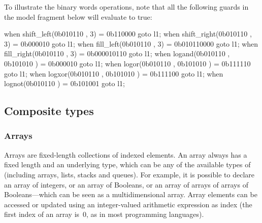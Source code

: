 \begin{example}
	To illustrate the binary words operations, note that all the following guards in the model fragment below will evaluate to true:

\begin{IMITATORmodel}
when shift_left(0b010110 , 3)     = 0b110000    goto l1;
when shift_right(0b010110 , 3)    = 0b000010    goto l1;
when fill_left(0b010110 , 3)      = 0b010110000 goto l1;
when fill_right(0b010110 , 3)     = 0b000010110 goto l1;
when logand(0b010110 , 0b101010 ) = 0b000010    goto l1;
when logor(0b010110 , 0b101010 )  = 0b111110    goto l1;
when logxor(0b010110 , 0b101010 ) = 0b111100    goto l1;
when lognot(0b010110 )            = 0b101001    goto l1;
\end{IMITATORmodel}

\end{example}

\subsection{Composite types}

\subsubsection{Arrays}\label{sss:arrays}

Arrays are fixed-length collections of indexed elements.
An array always has a fixed length and an underlying type, which can be any of the available types of \imitator{} (including arrays, lists, stacks and queues).
For example, it is possible to declare an array of integers, or an array of Booleans, or an array of arrays of arrays of Booleans---which can be seen as a multidimensional array.
%
Array elements can be accessed or updated using an integer-valued arithmetic expression as index (the first index of an array is~0, as in most programming languages).

